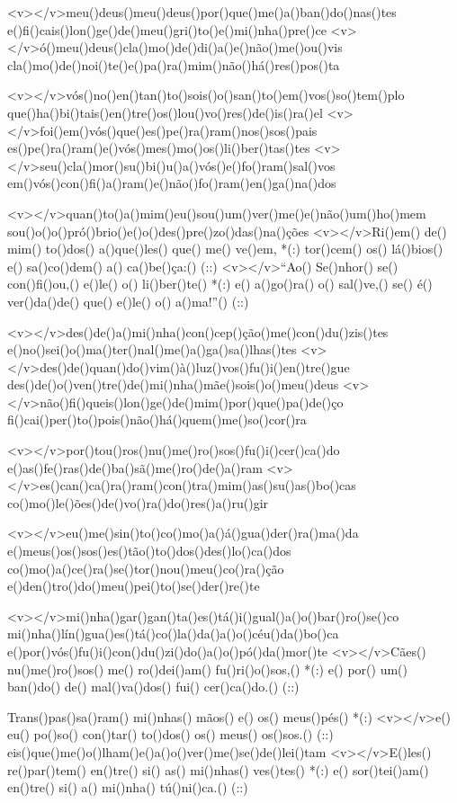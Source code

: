 <v></v>meu()deus()meu()deus()por()que()me()a()ban()do()nas()tes
e()fi()cais()lon()ge()de()meu()gri()to()e()mi()nha()pre()ce
<v></v>ó()meu()deus()cla()mo()de()di()a()e()não()me()ou()vis
cla()mo()de()noi()te()e()pa()ra()mim()não()há()res()pos()ta

<v></v>vós()no()en()tan()to()sois()o()san()to()em()vos()so()tem()plo
que()ha()bi()tais()en()tre()os()lou()vo()res()de()is()ra()el
<v></v>foi()em()vós()que()es()pe()ra()ram()nos()sos()pais
es()pe()ra()ram()e()vós()mes()mo()os()li()ber()tas()tes
<v></v>seu()cla()mor()su()bi()u()a()vós()e()fo()ram()sal()vos
em()vós()con()fi()a()ram()e()não()fo()ram()en()ga()na()dos

<v></v>quan()to()a()mim()eu()sou()um()ver()me()e()não()um()ho()mem
sou()o()o()pró()brio()e()o()des()pre()zo()das()na()ções
<v></v>Ri()em() de() mim() to()dos() a()que()les() que() me() ve()em, *(:)
tor()cem() os() lá()bios() e() sa()co()dem() a() ca()be()ça:() (::)
<v></v>``Ao() Se()nhor() se() con()fi()ou,() e()le() o() li()ber()te() *(:)
e() a()go()ra() o() sal()ve,() se() é() ver()da()de() que() e()le() o() a()ma!''() (::)

<v></v>des()de()a()mi()nha()con()cep()ção()me()con()du()zis()tes
e()no()sei()o()ma()ter()nal()me()a()ga()sa()lhas()tes
<v></v>des()de()quan()do()vim()à()luz()vos()fu()i()en()tre()gue
des()de()o()ven()tre()de()mi()nha()mãe()sois()o()meu()deus
<v></v>não()fi()queis()lon()ge()de()mim()por()que()pa()de()ço
fi()cai()per()to()pois()não()há()quem()me()so()cor()ra

<v></v>por()tou()ros()nu()me()ro()sos()fu()i()cer()ca()do
e()as()fe()ras()de()ba()sã()me()ro()de()a()ram
<v></v>es()can()ca()ra()ram()con()tra()mim()as()su()as()bo()cas
co()mo()le()ões()de()vo()ra()do()res()a()ru()gir

<v></v>eu()me()sin()to()co()mo()a()á()gua()der()ra()ma()da
e()meus()os()sos()es()tão()to()dos()des()lo()ca()dos
co()mo()a()ce()ra()se()tor()nou()meu()co()ra()ção
e()den()tro()do()meu()pei()to()se()der()re()te

<v></v>mi()nha()gar()gan()ta()es()tá()i()gual()a()o()bar()ro()se()co
mi()nha()lín()gua()es()tá()co()la()da()a()o()céu()da()bo()ca
e()por()vós()fu()i()con()du()zi()do()a()o()pó()da()mor()te
<v></v>Cães() nu()me()ro()sos() me() ro()dei()am() fu()ri()o()sos,() *(:)
e() por() um() ban()do() de() mal()va()dos() fui() cer()ca()do.() (::)

Trans()pas()sa()ram() mi()nhas() mãos() e() os() meus()pés() *(:)
<v></v>e() eu() po()so() con()tar() to()dos() os() meus() os()sos.() (::)
eis()que()me()o()lham()e()a()o()ver()me()se()de()lei()tam
<v></v>E()les() re()par()tem() en()tre() si() as() mi()nhas() ves()tes() *(:)
e() sor()tei()am() en()tre() si() a() mi()nha() tú()ni()ca.() (::)

